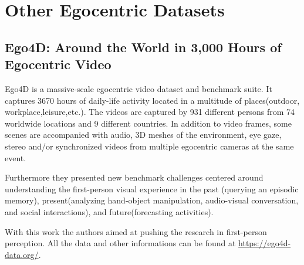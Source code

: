 
\section{Other Egocentric Datasets}
\subsection{Ego4D: Around the World in 3,000 Hours of Egocentric Video~\cite{ego4d}}
Ego4D is a massive-scale egocentric video dataset and 
benchmark suite. It captures 3670 hours of daily-life
activity located in a multitude of places(outdoor, workplace,leisure,etc.).
The videos are captured by 931 different persons from 74 worldwide
locations and 9 different countries. In addition to video frames, some
scenes are accompanied with audio, 3D meshes of the environment,
eye gaze, stereo and/or synchronized videos from multiple egocentric
cameras at the same event.

Furthermore they presented new benchmark challenges centered
around understanding the first-person visual experience in the past
(querying an episodic memory), present(analyzing hand-object manipulation,
audio-visual conversation, and social interactions), and future(forecasting activities).


With this work the authors aimed at pushing the research in first-person perception.
All the data and other informations can be found at 
\url{https://ego4d-data.org/}.